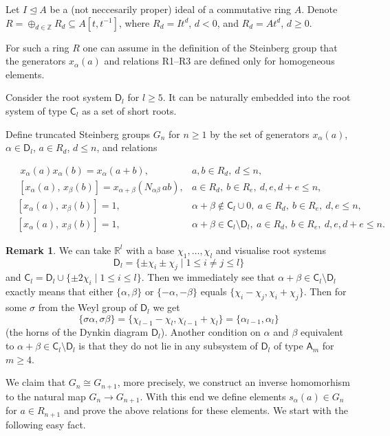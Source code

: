 \documentclass[oneside, 8pt]{amsart}
\theoremstyle{remark}
\theoremstyle{definition}
\newtheorem{rem}[lemma]{Remark}
\newcommand{\inv}{^{-1}}
\newcommand{\rA}{\mathsf{A}}
\newcommand{\rC}{\mathsf{C}}
\newcommand{\rD}{\mathsf{D}}
\numberwithin{equation}{section}
\begin{document}
Let $I\trianglelefteq A$ be a (not neccesarily proper) ideal of a commutative ring $A$. Denote $R=\oplus_{d\in\mathbb Z}R_d\subseteq A[t,t\inv]$, where $R_d=It^d$, $d<0$, and $R_d=At^d$, $d\geq0$.

For such a ring $R$ one can assume in the definition of the Steinberg group that the generators $x_\alpha(a)$ and relations R1--R3 are defined only for homogeneous elements. 

Consider the root system $\rD_l$ for $l\geq5$. It can be naturally embedded into the root system of type $\rC_l$ as a set of short roots.

Define truncated Steinberg groups $G_n$ for $n\geq1$ by the set of generators $x_\alpha(a)$, $\alpha\in\rD_l$, $a\in R_d$, $d\leq n$, and relations

\begin{align}
&\,\,x_{\alpha}(a)x_{\alpha}(b) =  x_{\alpha}(a+b),& a,b\in R_d,\ d\leq n, \tag{R$1_n$} \\
&\,[x_{\alpha}(a),\,x_{\beta}(b)]= x_{\alpha+\beta}(N_{\alpha\beta}\,ab),& a\in R_d,\ b\in R_e,\ d,e,d+e\leq n, \tag{R$2_n$} \\
&[x_{\alpha}(a),\,x_{\beta}(b)]= 1,& \alpha+\beta\not\in\rC_l\cup0,\ a\in R_d,\ b\in R_e,\ d,e\leq n, \tag{R$3.1_n$} \\
&[x_{\alpha}(a),\,x_{\beta}(b)]= 1,& \alpha+\beta\in\rC_l\setminus\rD_l,\ a\in R_d,\ b\in R_e,\ d,e,d+e\leq n. \tag{R$3.2_n$}
\end{align}

\begin{rem}
We can take $\mathbb R^l$ with a base $\chi_1,\ldots,\chi_l$ and visualise root systems
\[\rD_l=\{\pm\chi_i\pm\chi_j\mid1\leq i\neq j\leq l\}\]
and $\rC_l=\rD_l\cup\{\pm2\chi_i\mid1\leq i\leq l\}$. Then we immediately see that $\alpha+\beta\in\rC_l\setminus\rD_l$ exactly means that either $\{\alpha,\beta\}$ or $\{-\alpha,-\beta\}$ equals $\{\chi_i-\chi_j,\chi_i+\chi_j\}$. Then for some $\sigma$ from the Weyl group of $\rD_l$ we get 
\[ \{\sigma\alpha,\sigma\beta\}=\{\chi_{l-1}-\chi_l, \chi_{l-1}+\chi_l\}=\{\alpha_{l-1},\alpha_l\} \]
(the horns of the Dynkin diagram $\rD_l$). Another condition on $\alpha$ and $\beta$ equivalent to $\alpha+\beta\in\rC_l\setminus\rD_l$ is that they do not lie in any subsystem of $\rD_l$ of type $\rA_m$ for $m\geq4$.
\end{rem}

We claim that $G_n\cong G_{n+1}$, more precisely, we construct an inverse homomorhism to the natural map $G_n\rightarrow G_{n+1}$. With this end we define elements $s_\alpha(a)\in G_n$ for $a\in R_{n+1}$ and prove the above relations for these elements. We start with the following easy fact.
\end{document}
